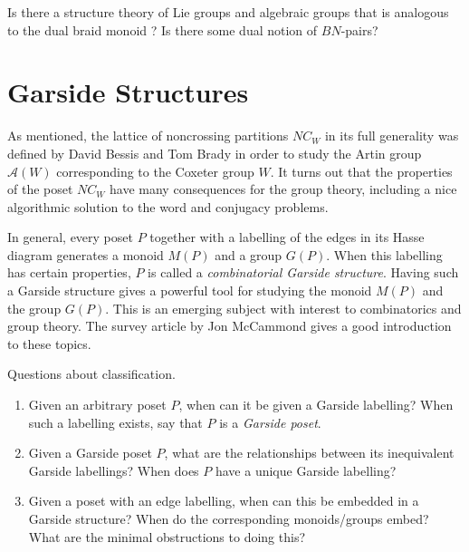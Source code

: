 \documentclass[12pt,letterpaper, reqno]{aimpl}
\newcommand{\A}{\mathcal A}
\begin{document}
\begin{prob}[3.4]
Is there a structure theory of Lie groups and algebraic groups that is analogous to the dual braid monoid \cite{bessis:dual}? Is there some dual notion of $BN$-pairs?
\end{prob}

\section{Garside Structures}
As mentioned, the lattice of noncrossing partitions $NC_W$ in its full generality was defined by David Bessis \cite{bessis:dual} and Tom Brady \cite{brady} in order to study the Artin group $\A(W)$ corresponding to the Coxeter group $W$. It turns out that the properties of the poset $NC_W$ have many consequences for the group theory, including a nice algorithmic solution to the word and conjugacy problems.

In general, every poset $P$ together with a labelling of the edges in its Hasse diagram generates a monoid $M(P)$ and a group $G(P)$. When this labelling has certain properties, $P$ is called a \emph{combinatorial Garside structure}. Having such a Garside structure gives a powerful tool for studying the monoid $M(P)$ and the group $G(P)$. This is an emerging subject with interest to combinatorics and group theory. The survey article \cite{mccammond:garside} by Jon McCammond gives a good introduction to these topics.

\begin{prob}[4.1]  Questions about classification.
\begin{enumerate}
\item Given an arbitrary poset $P$, when can it be given a Garside labelling? When such a labelling exists, say that $P$ is a \emph{Garside poset}.
\item Given a Garside poset $P$, what are the relationships between its inequivalent Garside labellings? When does $P$ have a unique Garside labelling?
\item Given a poset with an edge labelling, when can this be embedded in a Garside structure? When do the corresponding monoids/groups embed? What are the minimal obstructions to doing this?
\end{enumerate}
\end{prob}
\end{document}
